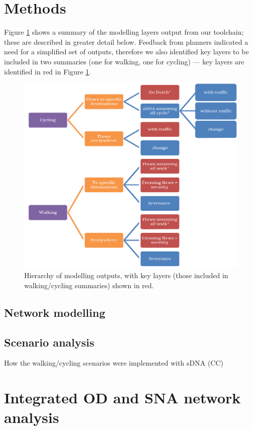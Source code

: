 \documentclass[galley]{jtlu-article-2col}
\begin{document}
\hypertarget{methods}{%
\section{Methods}\label{methods}}

Figure \ref{fig:flowchart} shows a summary of the modelling layers output from our toolchain; these are described in greater detail below.
Feedback from planners indicated a need for a simplified set of outputs, therefore we also identified key layers to be included in two summaries (one for walking, one for cycling) --- key layers are identified in red in Figure \ref{fig:flowchart}.

\begin{figure}

{\centering \includegraphics[width=0.6\linewidth]{figures/flowchart} 

}

\caption{Hierarchy of modelling outputs, with key layers (those included in walking/cycling summaries) shown in red.}\label{fig:flowchart}
\end{figure}

\hypertarget{network-modelling}{%
\subsection{Network modelling}\label{network-modelling}}

\hypertarget{scenario-analysis}{%
\subsection{Scenario analysis}\label{scenario-analysis}}

How the walking/cycling scenarios were implemented with sDNA (CC)

\hypertarget{integrated-od-and-sna-network-analysis}{%
\section{Integrated OD and SNA network analysis}\label{integrated-od-and-sna-network-analysis}}
\end{document}
